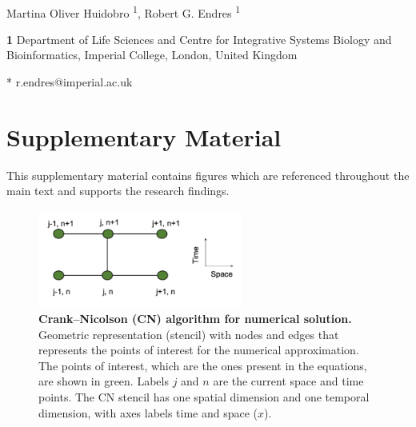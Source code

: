 \documentclass[10pt,letterpaper]{article}
\begin{document}
\vspace*{0.2in}

\begin{flushleft}
{\Large
\textbf{} %
}
\newline
\\
Martina Oliver Huidobro \textsuperscript{1},
Robert G. Endres \textsuperscript{1}


\bigskip
\textbf{1} Department of Life Sciences and Centre for Integrative Systems Biology and Bioinformatics, Imperial College, London, United Kingdom
\\
\bigskip

* r.endres@imperial.ac.uk

\end{flushleft}



\section*{Supplementary Material}

This supplementary material contains figures  which are referenced throughout the main text and supports the research findings.

\newcommand{\beginsupplement}{%
    \setcounter{table}{0}
    \renewcommand{\thetable}{S\arabic{table}}%
    \setcounter{figure}{0}
    \renewcommand{\thefigure}{S\arabic{figure}}%
}
\beginsupplement

\begin{figure}[!ht]
    \center
    \includegraphics[width=0.6\textwidth]{figures/stencils}

    \caption{{\bf Crank–Nicolson (CN) algorithm for numerical solution.}  Geometric representation (stencil) with nodes and edges that represents the points of interest for the numerical approximation. The points of interest, which are the ones present in the equations, are shown in green. Labels $j$ and $n$ are the current space and time points. The CN stencil has one spatial dimension and one temporal dimension, with axes labels time and space ($x$). }   \label{sup_fig1}
\end{figure}
\end{document}
